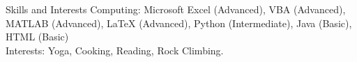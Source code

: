 \documentclass{resume} %
\begin{document}
\iffalse
\begin{rSection}{Achievements}

\begin{sSubsection}{}{}{}{}
\item Sixth Form Physics Cup (2012)
\item Sixth Form Mathematics Prize (2011)
\end{sSubsection}

\end{rSection}
\fi
\begin{rSection}{Skills and Interests}
Computing: Microsoft Excel (Advanced), VBA (Advanced), MATLAB (Advanced), LaTeX (Advanced), Python (Intermediate), Java (Basic), HTML (Basic)\\
Interests: Yoga, Cooking, Reading, Rock Climbing. \\


\end{rSection}




\end{document}
